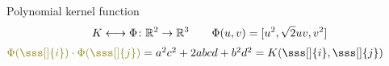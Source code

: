 \begin{frame}
\begin{block}{Polynomial kernel function}
\vspace{-15pt}
\begin{equation*}
K \longleftrightarrow \Phi\colon \Bbb{R}^2\rightarrow\Bbb{R}^3 \qquad \Phi(u,v) =  [u^2, \sqrt{2}uv, v^2]
\end{equation*}
$\textcolor{olive}{\Phi(\sss[]{i})\cdot \Phi(\sss[]{j})} = a^2c^2 + 2abcd + b^2d^2 = K(\sss[]{i},\sss[]{j})$

\end{block}
\end{frame}

